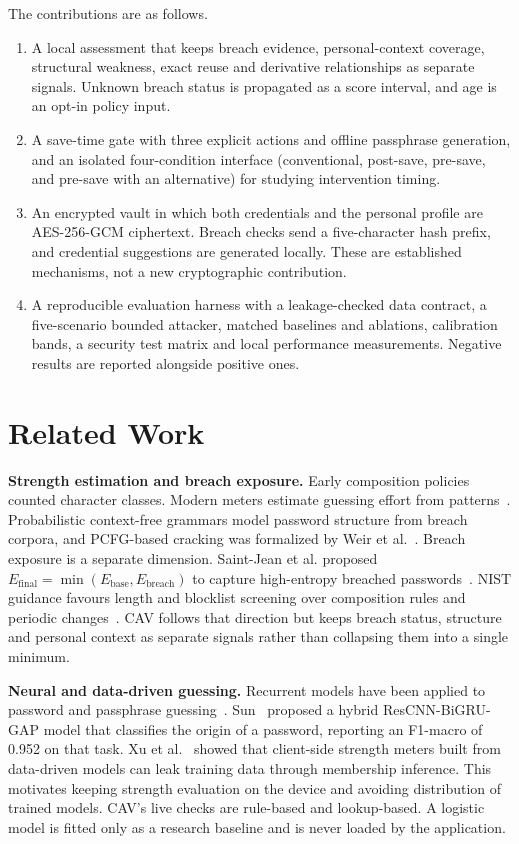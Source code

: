\documentclass[conference]{IEEEtran}
\begin{document}
The contributions are as follows.
\begin{enumerate}
\item A local assessment that keeps breach evidence, personal-context coverage, structural weakness, exact reuse and derivative relationships as separate signals. Unknown breach status is propagated as a score interval, and age is an opt-in policy input.
\item A save-time gate with three explicit actions and offline passphrase generation, and an isolated four-condition interface (conventional, post-save, pre-save, and pre-save with an alternative) for studying intervention timing.
\item An encrypted vault in which both credentials and the personal profile are AES-256-GCM ciphertext. Breach checks send a five-character hash prefix, and credential suggestions are generated locally. These are established mechanisms, not a new cryptographic contribution.
\item A reproducible evaluation harness with a leakage-checked data contract, a five-scenario bounded attacker, matched baselines and ablations, calibration bands, a security test matrix and local performance measurements. Negative results are reported alongside positive ones.
\end{enumerate}

\section{Related Work}
\textbf{Strength estimation and breach exposure.} Early composition policies counted character classes. Modern meters estimate guessing effort from patterns~\cite{wheeler}. Probabilistic context-free grammars model password structure from breach corpora, and PCFG-based cracking was formalized by Weir et al.~\cite{weir}. Breach exposure is a separate dimension. Saint-Jean et al. proposed $E_{\text{final}}=\min(E_{\text{base}},E_{\text{breach}})$ to capture high-entropy breached passwords~\cite{saintjean}. NIST guidance favours length and blocklist screening over composition rules and periodic changes~\cite{nist63b4}. CAV follows that direction but keeps breach status, structure and personal context as separate signals rather than collapsing them into a single minimum.

\textbf{Neural and data-driven guessing.} Recurrent models have been applied to password and passphrase guessing~\cite{nosenko}. Sun~\cite{sun} proposed a hybrid ResCNN-BiGRU-GAP model that classifies the origin of a password, reporting an F1-macro of 0.952 on that task. Xu et al.~\cite{xu} showed that client-side strength meters built from data-driven models can leak training data through membership inference. This motivates keeping strength evaluation on the device and avoiding distribution of trained models. CAV's live checks are rule-based and lookup-based. A logistic model is fitted only as a research baseline and is never loaded by the application.
\end{document}
